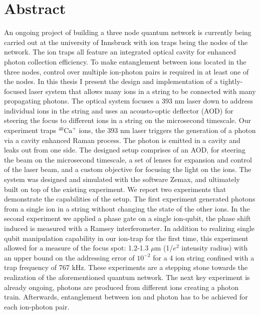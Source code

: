 \documentclass[english, a4paper, 12pt, twoside]{book}
\numberwithin{equation}{section} %
\begin{document}
{

}
\restoregeometry %

\thispagestyle{plain} %
\clearpage\mbox{}\clearpage %

\newpage

\section*{Abstract}
An ongoing project of building a three node quantum network is currently being carried out at the university of Innsbruck with ion traps being the nodes of the network. The ion traps all feature an integrated optical cavity for enhanced photon collection efficiency. To make entanglement between ions located in the three nodes, control over multiple ion-photon pairs is required in at least one of the nodes. In this thesis I present the design and implementation of a tightly-focused laser system that allows many ions in a string to be connected with many propagating photons. The optical system focuses a 393 nm laser down to address individual ions in the string and uses an acousto-optic deflector (AOD) for steering the focus to different ions in a string on the microsecond timescale. Our experiment traps $^{40}\text{Ca}^+$ ions, the 393 nm laser triggers the generation of a photon via a cavity enhanced Raman process. The photon is emitted in a cavity and leaks out from one side.
The designed setup comprises of an AOD, for steering the beam on the microsecond timescale, a set of lenses for expansion and control of the laser beam, and a custom objective for focusing the light on the ions. The system was designed and simulated with the software Zemax, and ultimately built on top of the existing experiment. We report two experiments that demonstrate the capabilities of the setup. The first experiment generated photons from a single ion in a string without changing the state of the other ions. In the second experiment we applied a phase gate on a single ion-qubit, the phase shift induced is measured with a Ramsey interferometer. In addition to realizing single qubit manipulation capability in our ion-trap for the first time, this experiment allowed for a measure of the focus spot: 1.2-1.3 $\mu$m (1/$e^2$ intensity radius) with an upper bound on the addressing error of $10^{-2}$ for a 4 ion string confined with a trap frequency of 767 kHz. These experiments are a stepping stone towards the realization of the aforementioned quantum network. The next key experiment is already ongoing, photons are produced from different ions creating a photon train. Afterwards, entanglement between ion and photon has to be achieved for each ion-photon pair.
\end{document}
